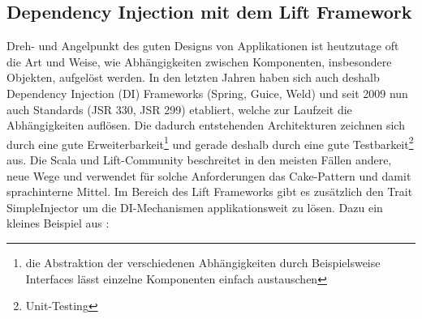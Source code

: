 \subsection{Dependency Injection mit dem Lift Framework}\label{lift:di}
Dreh- und Angelpunkt des guten Designs von Applikationen ist heutzutage oft die Art und Weise, wie Abh\"angigkeiten zwischen Komponenten, insbesondere Objekten, aufgel\"ost werden. In den letzten Jahren haben sich auch deshalb Dependency Injection (DI) Frameworks (Spring, Guice, Weld) und seit 2009 nun auch Standards (JSR 330, JSR 299) etabliert, welche zur Laufzeit die Abh\"angigkeiten aufl\"osen. Die dadurch entstehenden Architekturen zeichnen sich durch eine gute Erweiterbarkeit\footnote{die Abstraktion der verschiedenen Abh\"angigkeiten durch Beispielsweise Interfaces l\"asst einzelne Komponenten einfach austauschen} und gerade deshalb durch eine gute Testbarkeit\footnote{Unit-Testing} aus. Die Scala und Lift-Community beschreitet in den meisten F\"allen andere, neue Wege und verwendet f\"ur solche Anforderungen das Cake-Pattern\cite{bonerCakePattern}\cite{oderskyCakePattern} und damit sprachinterne Mittel. Im Bereich des Lift Frameworks gibt es zus\"atzlich den Trait SimpleInjector um  die DI-Mechanismen applikationsweit zu l\"osen. Dazu ein kleines Beispiel aus \cite{lift:di}:

